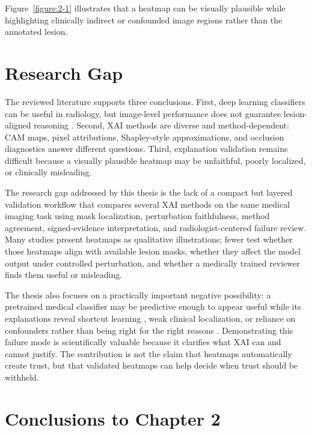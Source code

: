 Figure~\ref{figure:2-1} illustrates that a heatmap can be visually plausible
while highlighting clinically indirect or confounded image regions
rather than the annotated lesion.

\hypertarget{research-gap}{%
	\section{Research Gap}\label{research-gap}}

The reviewed literature supports three conclusions. First, deep learning
classifiers can be useful in radiology, but image-level performance does
not guarantee lesion-aligned reasoning
\cite{ref-cxr-generalization-zech, ref-hidden-stratification}. Second,
XAI methods are diverse and method-dependent: CAM maps, pixel
attributions, Shapley-style approximations, and occlusion diagnostics
answer different questions. Third, explanation validation remains
difficult because a visually plausible heatmap may be unfaithful, poorly
localized, or clinically misleading.

The research gap addressed by this thesis is the lack of a compact but
layered validation workflow that compares several XAI methods on the
same medical imaging task using mask localization, perturbation
faithfulness, method agreement, signed-evidence interpretation, and
radiologist-centered failure review. Many studies present heatmaps as
qualitative illustrations; fewer test whether those heatmaps align with
available lesion masks, whether they affect the model output under
controlled perturbation, and whether a medically trained reviewer finds
them useful or misleading.

The thesis also focuses on a practically important negative possibility:
a pretrained medical classifier may be predictive enough to appear
useful while its explanations reveal shortcut learning
\cite{ref-shortcut-learning, ref-radiology-shortcuts}, weak clinical
localization, or reliance on confounders rather than being right for the
right reasons \cite{ref-right-reasons, ref-race-medical-imaging}.
Demonstrating this failure mode is scientifically valuable because it
clarifies what XAI can and cannot justify. The contribution is not the
claim that heatmaps automatically create trust, but that validated
heatmaps can help decide when trust should be withheld.

\hypertarget{conclusions-to-chapter-2}{%
	\section*{Conclusions to Chapter 2}\label{conclusions-to-chapter-2}}

